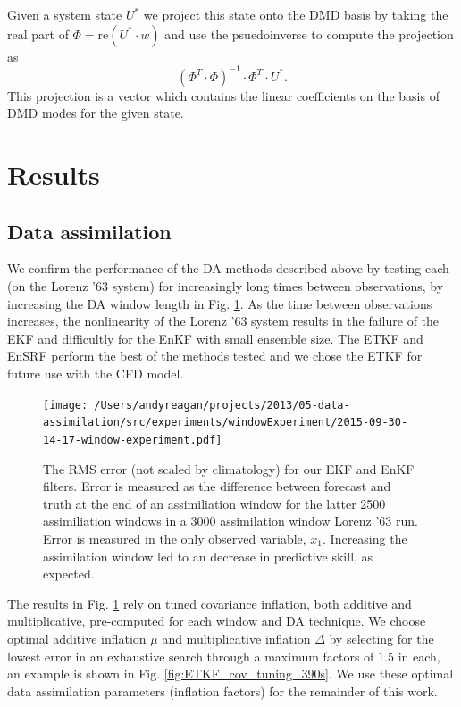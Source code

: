 Given a system state $U^*$ we project this state onto the DMD basis by taking the real part of $\Phi = \text{re}\left (U^*\cdot w\right)$ and use the psuedoinverse to compute the projection as $$(\Phi^T \cdot \Phi)^{-1} \cdot \Phi ^T \cdot U^*.$$
This projection is a vector which contains the linear coefficients on the basis of DMD modes for the given state.

\section*{Results}

\subsection*{Data assimilation}
\label{data_assimilation_section}

We confirm the performance of the DA methods described above by testing each (on the Lorenz '63 system) for increasingly long times between observations, by increasing the DA window length in Fig. \ref{fig:window_test}.
As the time between observations increases, the nonlinearity of the Lorenz '63 system results in the failure of the EKF and difficultly for the EnKF with small ensemble size.
The ETKF and EnSRF perform the best of the methods tested and we chose the ETKF for future use with the CFD model.

\begin{figure}[h]
  \centering
  \texttt{[image: /Users/andyreagan/projects/2013/05-data-assimilation/src/experiments/windowExperiment/2015-09-30-14-17-window-experiment.pdf]}
  \caption[The RMS error is reported for our EKF and EnKF filters]{
    The RMS error (not scaled by climatology) for our EKF and EnKF filters.
    Error is measured as the difference between forecast and truth at the end of an assimiliation window for the latter 2500 assimiliation windows in a 3000 assimilation window Lorenz '63 run.
    Error is measured in the only observed variable, $x_1$.
    Increasing the assimilation window led to an decrease in predictive skill, as expected.
  }
  \label{fig:window_test}
\end{figure}

The results in Fig. \ref{fig:window_test} rely on tuned covariance inflation, both additive and multiplicative, pre-computed for each window and DA technique.
We choose optimal additive inflation $\mu$ and multiplicative inflation $\Delta$ by selecting for the lowest error in an exhaustive search through a maximum factors of $1.5$ in each, an example is shown in Fig. \ref{fig:ETKF_cov_tuning_390s}.
We use these optimal data assimilation parameters (inflation factors) for the remainder of this work.

